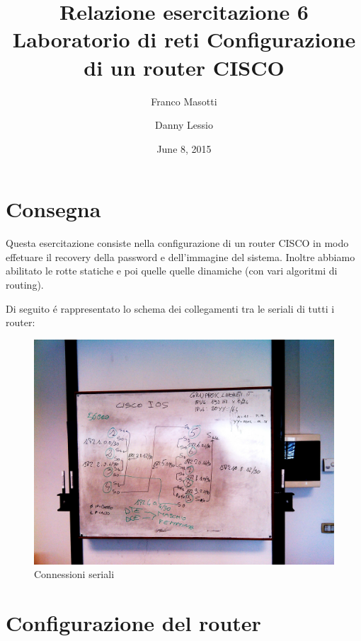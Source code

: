 \documentclass[9pt, a4paper, oneside]{article}
\title{Relazione esercitazione 6 Laboratorio di reti\newline
Configurazione di un router CISCO}
\author{Franco Masotti \and Danny Lessio}
\date{June 8, 2015}
\begin{document}
	\maketitle
	\tableofcontents
	\newpage
	\part{Consegna}
			\par
				Questa esercitazione consiste nella 
				configurazione di un router CISCO in modo 
				effetuare il recovery della password e 
				dell'immagine del sistema. Inoltre abbiamo 
				abilitato le rotte statiche e poi quelle 
				quelle dinamiche (con vari algoritmi di 
				routing).
			\par
				Di seguito \'e rappresentato lo schema dei 
				collegamenti tra le seriali di tutti i router:
				\begin{figure}[H]
					\centering
					\caption{Connessioni seriali}
					\includegraphics[scale=0.16]{../source/schema_connessioni.jpg}
				\end{figure}
		\newpage
	\part{Configurazione del router}
\end{document}
